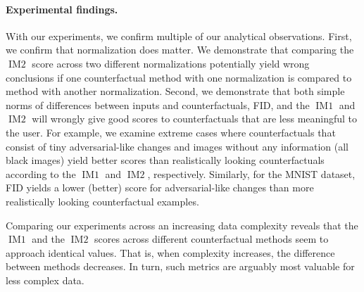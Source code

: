 \documentclass[11pt,a4paper,twoside,openright,final]{memoir}
\begin{document}
\paragraph{Experimental findings.}
With our experiments, we confirm multiple of our analytical observations.
First, we confirm that normalization does matter.
We demonstrate that comparing the $\operatorname{IM2}$ score across two different normalizations potentially yield wrong conclusions if one counterfactual method with one normalization is compared to method with another normalization. 
Second, we demonstrate that both simple norms of differences between inputs and counterfactuals, FID, and the $\operatorname{IM1}$ and $\operatorname{IM2}$ will wrongly give good scores to counterfactuals that are less meaningful to the user.
For example, we examine extreme cases where counterfactuals that consist of tiny adversarial-like changes and images without any information (all black images) yield better scores than realistically looking counterfactuals according to the $\operatorname{IM1}$ and $\operatorname{IM2}$, respectively.
Similarly, for the MNIST dataset, FID yields a lower (better) score for adversarial-like changes than more realistically looking counterfactual examples.

Comparing our experiments across an increasing data complexity reveals that the $\operatorname{IM1}$ and the $\operatorname{IM2}$ scores across different counterfactual methods seem to approach identical values.
That is, when complexity increases, the difference between methods decreases.
In turn, such metrics are arguably most valuable for less complex data.
\end{document}
